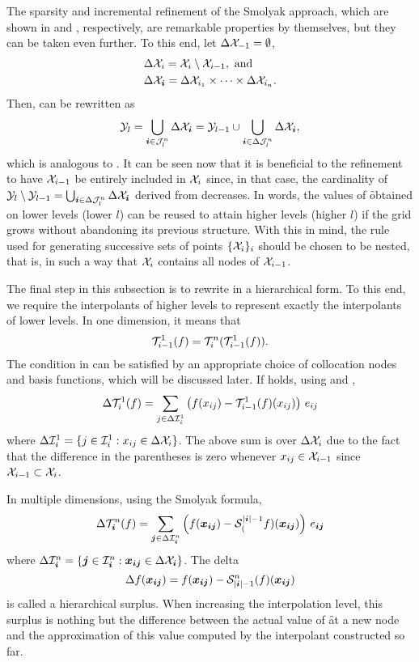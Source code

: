 The sparsity and incremental refinement of the Smolyak approach, which are shown
in  and , respectively, are
remarkable properties by themselves, but they can be taken even further. To this
end, let $\Delta\mathcal{X}_{-1} = \emptyset$,
\[
  \begin{split}
    & \Delta\mathcal{X}_i = \mathcal{X}_i \setminus \mathcal{X}_{i - 1}, \text{ and } \\
    & \Delta\mathcal{X}_{\boldsymbol{i}} = \Delta\mathcal{X}_{i_1} \times \cdots \times \Delta\mathcal{X}_{i_n}.
  \end{split}
\]
Then,  can be rewritten as
\[
  \mathcal{Y}_l = \bigcup_{\boldsymbol{i} \in \mathcal{J}^{n}_{l}} \Delta\mathcal{X}_{\boldsymbol{i}} = \mathcal{Y}_{l - 1} \cup \bigcup_{\boldsymbol{i} \in \Delta\mathcal{J}^{n}_{l}} \Delta\mathcal{X}_{\boldsymbol{i}},
\]
which is analogous to . It can be seen now that it is
beneficial to the refinement to have $\mathcal{X}_{i - 1}$ be entirely included in $\mathcal{X}_i$
since, in that case, the cardinality of $\mathcal{Y}_l \setminus \mathcal{Y}_{l - 1} =
\bigcup_{\boldsymbol{i} \in \Delta\mathcal{J}^{n}_{l}} \Delta\mathcal{X}_{\boldsymbol{i}}$ derived from
 decreases. In words, the values of \f obtained
on lower levels (lower $l$) can be reused to attain higher levels (higher $l$)
if the grid grows without abandoning its previous structure. With this in mind,
the rule used for generating successive sets of points $\{ \mathcal{X}_i \}_i$ should be
chosen to be nested, that is, in such a way that $\mathcal{X}_i$ contains all nodes of
$\mathcal{X}_{i - 1}$.

The final step in this subsection is to rewrite  in a
hierarchical form. To this end, we require the interpolants of higher levels to
represent exactly the interpolants of lower levels. In one dimension, it means
that
\[
  \mathcal{T}^{1}_{i - 1}(f) = \mathcal{T}^{n}_{i}(\mathcal{T}^{1}_{i - 1}(f)).
\]
The condition in  can be satisfied by an appropriate
choice of collocation nodes and basis functions, which will be discussed later.
If  holds, using  and
,
\[
  \Delta\mathcal{T}^{1}_{i}(f) = \sum_{j \in \Delta\mathcal{I}^{1}_{i}} \left( f(x_{ij}) - \mathcal{T}^{1}_{i - 1}(f)(x_{ij}) \right) \, e_{ij}
\]
where $\Delta\mathcal{I}^{1}_{i} = \{ j \in \mathcal{I}^{1}_{i}: x_{ij} \in
\Delta\mathcal{X}_i \}$. The above sum is over $\Delta\mathcal{X}_i$ due to the fact that the
difference in the parentheses is zero whenever $x_{ij} \in \mathcal{X}_{i - 1}$ since
$\mathcal{X}_{i - 1} \subset \mathcal{X}_i$.

In multiple dimensions, using the Smolyak formula,
\[
  \Delta\mathcal{T}^{n}_{\boldsymbol{i}}(f) = \sum_{\boldsymbol{j} \in \Delta\mathcal{I}^{n}_{\boldsymbol{i}}} \left( f(\boldsymbol{x}_{\boldsymbol{i}\boldsymbol{j}}) - \mathcal{S}^{|\boldsymbol{i}| - 1}_{(}f)(\boldsymbol{x}_{\boldsymbol{i} \boldsymbol{j}}) \right) \, e_{\boldsymbol{i} \boldsymbol{j}}
\]
where $\Delta\mathcal{I}^{n}_{\boldsymbol{i}} = \{ \boldsymbol{j} \in \mathcal{I}^{n}_{\boldsymbol{i}}:
\boldsymbol{x}_{\boldsymbol{i} \boldsymbol{j}} \in \Delta\mathcal{X}_{\boldsymbol{i}} \}$. The delta
\[
  \Delta f(\boldsymbol{x}_{\boldsymbol{i} \boldsymbol{j}}) = f(\boldsymbol{x}_{\boldsymbol{i} \boldsymbol{j}}) - \mathcal{S}^{n}_{|\boldsymbol{i}| - 1}(f)(\boldsymbol{x}_{\boldsymbol{i} \boldsymbol{j}})
\]
is called a hierarchical surplus. When increasing the interpolation level, this
surplus is nothing but the difference between the actual value of \f at a new
node and the approximation of this value computed by the interpolant constructed
so far.

